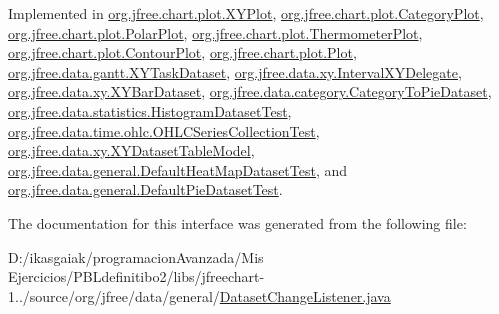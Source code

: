 Implemented in \mbox{\hyperlink{classorg_1_1jfree_1_1chart_1_1plot_1_1_x_y_plot_a87830fd0f3fe900f044bb6e4e47bcb63}{org.\+jfree.\+chart.\+plot.\+X\+Y\+Plot}}, \mbox{\hyperlink{classorg_1_1jfree_1_1chart_1_1plot_1_1_category_plot_a18c1d4bbfe9b7646dc1e51246e5c11ff}{org.\+jfree.\+chart.\+plot.\+Category\+Plot}}, \mbox{\hyperlink{classorg_1_1jfree_1_1chart_1_1plot_1_1_polar_plot_a8881e298d2cedacb87d1137c6dcc2c50}{org.\+jfree.\+chart.\+plot.\+Polar\+Plot}}, \mbox{\hyperlink{classorg_1_1jfree_1_1chart_1_1plot_1_1_thermometer_plot_aba0587d6e40888042aef46c570fc1237}{org.\+jfree.\+chart.\+plot.\+Thermometer\+Plot}}, \mbox{\hyperlink{classorg_1_1jfree_1_1chart_1_1plot_1_1_contour_plot_a40bc415932898100acb31d6bfc7b04fa}{org.\+jfree.\+chart.\+plot.\+Contour\+Plot}}, \mbox{\hyperlink{classorg_1_1jfree_1_1chart_1_1plot_1_1_plot_ab94fcf91fa4d77787f3cb013a806ba07}{org.\+jfree.\+chart.\+plot.\+Plot}}, \mbox{\hyperlink{classorg_1_1jfree_1_1data_1_1gantt_1_1_x_y_task_dataset_ac1eea7e4ceef30a38ca3001991648347}{org.\+jfree.\+data.\+gantt.\+X\+Y\+Task\+Dataset}}, \mbox{\hyperlink{classorg_1_1jfree_1_1data_1_1xy_1_1_interval_x_y_delegate_aaec31bcad7387d643284cd2a3ca576ce}{org.\+jfree.\+data.\+xy.\+Interval\+X\+Y\+Delegate}}, \mbox{\hyperlink{classorg_1_1jfree_1_1data_1_1xy_1_1_x_y_bar_dataset_afb40c3c8580e0a88758707acb30d5d17}{org.\+jfree.\+data.\+xy.\+X\+Y\+Bar\+Dataset}}, \mbox{\hyperlink{classorg_1_1jfree_1_1data_1_1category_1_1_category_to_pie_dataset_a4c793a0222730fcb45a6c05279342269}{org.\+jfree.\+data.\+category.\+Category\+To\+Pie\+Dataset}}, \mbox{\hyperlink{classorg_1_1jfree_1_1data_1_1statistics_1_1_histogram_dataset_test_a11232792d7a1f26177de568009b95679}{org.\+jfree.\+data.\+statistics.\+Histogram\+Dataset\+Test}}, \mbox{\hyperlink{classorg_1_1jfree_1_1data_1_1time_1_1ohlc_1_1_o_h_l_c_series_collection_test_af113a690321427d2eed1dc0815dca2fe}{org.\+jfree.\+data.\+time.\+ohlc.\+O\+H\+L\+C\+Series\+Collection\+Test}}, \mbox{\hyperlink{classorg_1_1jfree_1_1data_1_1xy_1_1_x_y_dataset_table_model_a27492e15f01464d63a9a5983e1460ebb}{org.\+jfree.\+data.\+xy.\+X\+Y\+Dataset\+Table\+Model}}, \mbox{\hyperlink{classorg_1_1jfree_1_1data_1_1general_1_1_default_heat_map_dataset_test_a100da8375a9df33cfaf02122bac9f131}{org.\+jfree.\+data.\+general.\+Default\+Heat\+Map\+Dataset\+Test}}, and \mbox{\hyperlink{classorg_1_1jfree_1_1data_1_1general_1_1_default_pie_dataset_test_a75f7f7699640f9c594fe0ff43aae0e83}{org.\+jfree.\+data.\+general.\+Default\+Pie\+Dataset\+Test}}.



The documentation for this interface was generated from the following file\+:\begin{DoxyCompactItemize}
\item 
D\+:/ikasgaiak/programacion\+Avanzada/\+Mis Ejercicios/\+P\+B\+Ldefinitibo2/libs/jfreechart-\/1../source/org/jfree/data/general/\mbox{\hyperlink{_dataset_change_listener_8java}{Dataset\+Change\+Listener.\+java}}\end{DoxyCompactItemize}
